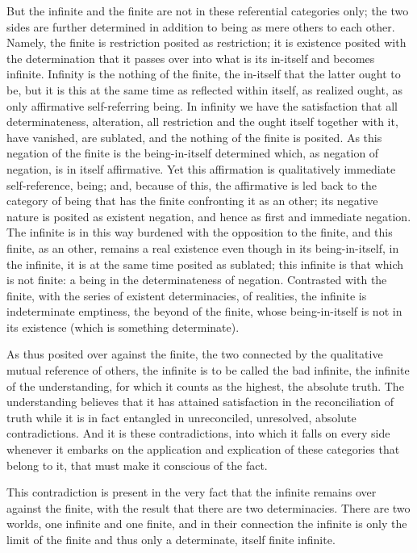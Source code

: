 But the infinite and the finite are not in these referential categories only;
the two sides are further determined in addition
to being as mere others to each other.
Namely, the finite is restriction posited as restriction;
it is existence posited with the determination
that it passes over into what is its
in-itself and becomes infinite.
Infinity is the nothing of the finite,
the in-itself that the latter ought to be,
but it is this at the same time as reflected within itself,
as realized ought, as only affirmative self-referring being.
In infinity we have the satisfaction
that all determinateness, alteration, all restriction
and the ought itself together with it,
have vanished, are sublated,
and the nothing of the finite is posited.
As this negation of the finite is the being-in-itself determined
which, as negation of negation, is in itself affirmative.
Yet this affirmation is qualitatively immediate self-reference, being;
and, because of this, the affirmative is led back
to the category of being that has the finite confronting it as an other;
its negative nature is posited as existent negation,
and hence as first and immediate negation.
The infinite is in this way burdened with the opposition to the finite,
and this finite, as an other, remains a real existence
even though in its being-in-itself, in the infinite,
it is at the same time posited as sublated;
this infinite is that which is not finite:
a being in the determinateness of negation.
Contrasted with the finite,
with the series of existent determinacies,
of realities,
the infinite is indeterminate emptiness,
the beyond of the finite,
whose being-in-itself is not in its existence
(which is something determinate).

As thus posited over against the finite,
the two connected by the qualitative mutual reference of others,
the infinite is to be called the bad infinite,
the infinite of the understanding,
for which it counts as the highest,
the absolute truth.
The understanding believes that
it has attained satisfaction
in the reconciliation of truth
while it is in fact entangled in unreconciled,
unresolved, absolute contradictions.
And it is these contradictions,
into which it falls on every side whenever
it embarks on the application and explication
of these categories that belong to it,
that must make it conscious of the fact.

This contradiction is present in the very fact
that the infinite remains over against the finite,
with the result that there are two determinacies.
There are two worlds, one infinite and one finite,
and in their connection the infinite is only
the limit of the finite and thus only a determinate,
itself finite infinite.

